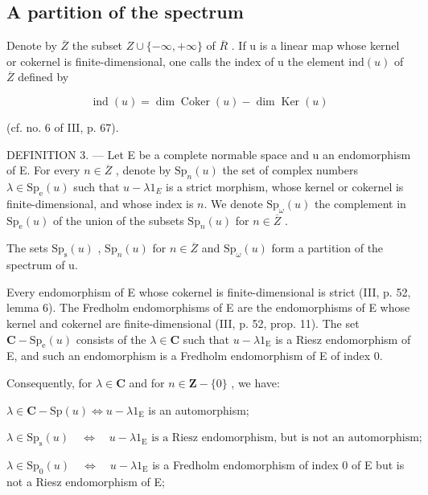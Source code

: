 \subsection{A partition of the spectrum}

Denote by \(\overline{Z}\) the subset \(Z \cup \{-\infty, +\infty\}\) of \(\overline{R}\) . If u is a linear map whose kernel or cokernel is finite-dimensional, one calls the index of u the element \(\text{ind}(u)\) of \(\overline{Z}\) defined by

\[
\operatorname{ind} (u) = \dim \operatorname{Coker} (u) - \dim \operatorname{Ker} (u)
\]

(cf. no. 6 of III, p. 67).

DEFINITION 3. --- Let E be a complete normable space and u an endomorphism of E. For every \(n \in \overline{Z}\) , denote by \(\mathrm{Sp}_{n}(u)\) the set of complex numbers \(\lambda \in \mathrm{Sp}_{\mathrm{e}}(u)\) such that \(u - \lambda1_{E}\) is a strict morphism, whose kernel or cokernel is finite-dimensional, and whose index is \(n\). We denote \(\mathrm{Sp}_{\omega}(u)\) the complement in \(\mathrm{Sp}_{\mathrm{e}}(u)\) of the union of the subsets \(\mathrm{Sp}_{n}(u)\) for \(n \in \overline{Z}\) .

The sets \(\mathrm{Sp}_{\mathrm{s}}(u)\) , \(\mathrm{Sp}_{n}(u)\) for \(n \in \overline{Z}\) and \(\mathrm{Sp}_{\omega}(u)\) form a partition of the spectrum of u.

Every endomorphism of E whose cokernel is finite-dimensional is strict (III, p. 52, lemma 6). The Fredholm endomorphisms of E are the endomorphisms of E whose kernel and cokernel are finite-dimensional (III, p. 52, prop. 11). The set \(\mathbf{C} - \mathrm{Sp}_{\mathrm{e}}(u)\) consists of the \(\lambda \in \mathbf{C}\) such that \(u - \lambda 1_{\mathrm{E}}\) is a Riesz endomorphism of E, and such an endomorphism is a Fredholm endomorphism of E of index 0.

Consequently, for \(\lambda \in \mathbf{C}\) and for \(n\in \mathbf{Z} - \{0\}\) , we have:

\(\lambda \in \mathbf{C} - \mathrm{Sp}(u) \iff u - \lambda 1_{\mathrm{E}}\) is an automorphism;

\(\lambda \in \mathrm{Sp}_{\mathrm{s}}(u) \quad \Longleftrightarrow \quad u - \lambda 1_{\mathrm{E}} \text{ is a Riesz endomorphism, but is not an automorphism;}\)

\(\lambda \in \mathrm{Sp}_{0}(u) \quad \Longleftrightarrow \quad u - \lambda 1_{\mathrm{E}}\) is a Fredholm endomorphism of index 0 of E but is not a Riesz endomorphism of E;


